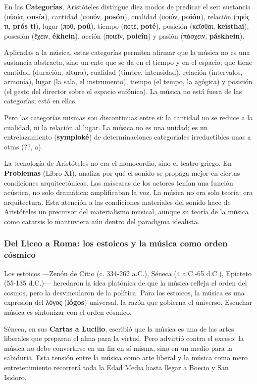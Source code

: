 \documentclass[14pt, a4paper]{article}
\begin{document}
En las \textbf{Categorías}, Aristóteles distingue diez modos de predicar el
ser: sustancia (οὐσία, \textbf{ousía}), cantidad (ποσόν, \textbf{posón}), cualidad
(ποιόν, \textbf{poión}), relación (πρός τι, \textbf{prós ti}), lugar (ποῦ, \textbf{poû}),
tiempo (ποτέ, \textbf{poté}), posición (κεῖσθαι, \textbf{keîsthai}), posesión
(ἔχειν, \textbf{ékhein}), acción (ποιεῖν, \textbf{poieîn}) y pasión (πάσχειν,
\textbf{páskhein}).

Aplicadas a la música, estas categorías permiten afirmar que la música
no es una sustancia abstracta, sino un ente que se da en el tiempo y
en el espacio; que tiene cantidad (duración, altura), cualidad (timbre,
intensidad), relación (intervalos, armonía), lugar (la sala, el
instrumento), tiempo (el tempo, la agógica) y posición (el gesto del
director sobre el espacio eufónico). La música no está fuera de las
categorías; está en ellas.

Pero las categorías mismas son discontinuas entre sí: la cantidad no se
reduce a la cualidad, ni la relación al lugar. La música no es una
unidad; es un entrelazamiento (\textbf{symploké}) de determinaciones
categoriales irreductibles unas a otras (??, a).

La tecnología de Aristóteles no era el monocordio, sino el teatro
griego. En \textbf{Problemas} (Libro XI), analiza por qué el sonido se
propaga mejor en ciertas condiciones arquitectónicas. Las máscaras de
los actores tenían una función acústica, no solo dramática: amplificaban
la voz. La música no era solo teoría: era arquitectura. Esta atención
a las condiciones materiales del sonido hace de Aristóteles un
precursor del materialismo musical, aunque su teoría de la música como
catarsis lo mantuviera aún dentro del paradigma idealista.
\subsubsection{Del Liceo a Roma: los estoicos y la música como orden cósmico}
\label{estoicos}
Los estoicos —Zenón de Citio (c. 334-262 a.C.), Séneca (4 a.C.-65
d.C.), Epicteto (55-135 d.C.)— heredaron la idea platónica de que la
música refleja el orden del cosmos, pero la desvincularon de la
política. Para los estoicos, la música es una expresión del λόγος
(\textbf{lógos}) universal, la razón que gobierna el universo. Escuchar
música es sintonizar con el orden cósmico.

Séneca, en sus \textbf{Cartas a Lucilio}, escribió que la música es una de
las artes liberales que preparan el alma para la virtud. Pero advirtió
contra el exceso: la música no debe convertirse en un fin en sí misma,
sino en un medio para la sabiduría. Esta tensión entre la música como
arte liberal y la música como mero entretenimiento recorrerá toda la
Edad Media hasta llegar a Boecio y San Isidoro.
\end{document}
